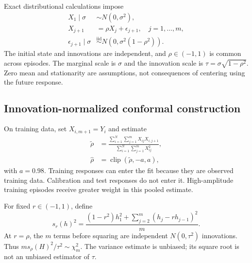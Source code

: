 \documentclass[nolineno]{ieeeaccess}
\newcommand{\clip}{\operatorname{clip}}
\begin{document}
Exact distributional calculations impose
\begin{align}
X_1\mid\sigma&\sim N(0,\sigma^2),\nonumber\\
X_{j+1}&=\rho X_j+\epsilon_{j+1},\quad j=1,\ldots,m,\label{eq:model}\\
\epsilon_{j+1}\mid\sigma&\overset{\mathrm{iid}}{\sim}N(0,\sigma^2(1-\rho^2)).\nonumber
\end{align}
The initial state and innovations are independent, and $\rho\in(-1,1)$ is common across episodes. The marginal scale is $\sigma$ and the innovation scale is $\tau=\sigma\sqrt{1-\rho^2}$. Zero mean and stationarity are assumptions, not consequences of centering using the future response.

\subsection{Innovation-normalized conformal construction}
On training data, set $X_{i,m+1}=Y_i$ and estimate
\begin{align}
\widetilde\rho&=
\frac{\sum_{i=1}^{N}\sum_{j=1}^{m}X_{ij}X_{i,j+1}}
{\sum_{i=1}^{N}\sum_{j=1}^{m}X_{ij}^{2}},\nonumber\\
\widehat\rho&=\clip(\widetilde\rho,-a,a),
\label{eq:fit}
\end{align}
with $a=0.98$. Training responses can enter the fit because they are observed training data. Calibration and test responses do not enter it. High-amplitude training episodes receive greater weight in this pooled estimate.

For fixed $r\in(-1,1)$, define
\begin{equation}
s_r(h)^2=\frac{(1-r^2)h_1^2+\sum_{j=2}^{m}(h_j-rh_{j-1})^2}{m}.
\label{eq:scale}
\end{equation}
At $r=\rho$, the $m$ terms before squaring are independent $N(0,\tau^2)$ innovations. Thus $ms_\rho(H)^2/\tau^2\sim\chi_m^2$. The variance estimate is unbiased; its square root is not an unbiased estimator of $\tau$.
\end{document}
